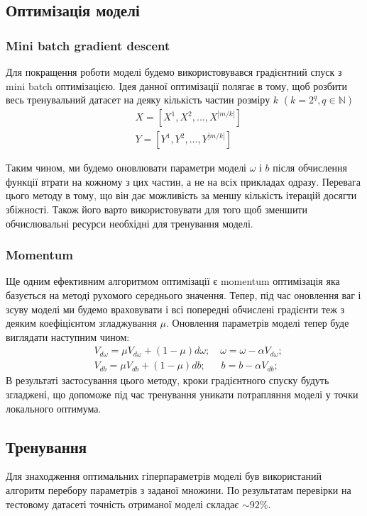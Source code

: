 \documentclass[a4paper,14pt]{extreport}
\begin{document}
	\subsection{Оптимізація моделі}
	\subsubsection{Mini batch gradient descent}
	\noindent
	Для покращення роботи моделі будемо використовувався градієнтний спуск з mini batch  оптимізацією. Ідея данної оптимізації полягає в тому, щоб розбити весь тренувальний датасет на деяку кількість частин розміру $k$ $(k=2^{q}, q \in  \mathbb{N})$
	\begin{align*}
	&X = [X^{1}, X^{2}, ..., X^{|m/k|}]\\
	&Y = [Y^{1}, Y^{2}, ..., Y^{|m/k|}]
	\end{align*}
	
	Таким чином, ми будемо оновлювати параметри моделі $\omega$ і $b$ після обчислення функції втрати на кожному з цих частин, а не на всіх прикладах одразу. Перевага цього методу в тому, що він дає можливість за меншу кількість ітерацій досягти збіжності. Також його варто використовувати для того щоб зменшити обчислювальні ресурси необхідні для тренування моделі.

	\subsubsection{Momentum}
	\noindent
	Ще одним ефективним алгоритмом оптимізації є momentum оптимізація яка базується на методі рухомого середнього значення. Тепер, під час оновлення ваг і зсуву моделі ми будемо враховувати і всі попередні обчислені градієнти теж з деяким коефіцієнтом згладжування $\mu$. Оновлення параметрів моделі тепер буде виглядати наступним чином:
	\begin{align*}
		&V_{d\omega} = \mu V_{d\omega} + (1 - \mu) d\omega; \quad 
		\omega = \omega - \alpha V_{d\omega}; \\
		&V_{db} = \mu V_{db} + (1 - \mu) db; \; \; \quad
		b= b - \alpha V_{db}; 
	\end{align*}
	В результаті застосування цього методу, кроки градієнтного спуску будуть згладжені, що допоможе під час тренування уникати потрапляння моделі у точки локального оптимума.
	
	\subsection{Тренування}
	Для знаходження оптимальних гіперпараметрів моделі був використаний алгоритм перебору параметрів з заданої множини. По результатам перевірки на тестовому датасеті точність отриманої моделі складає $\sim 92\%$.
	
\end{document}
